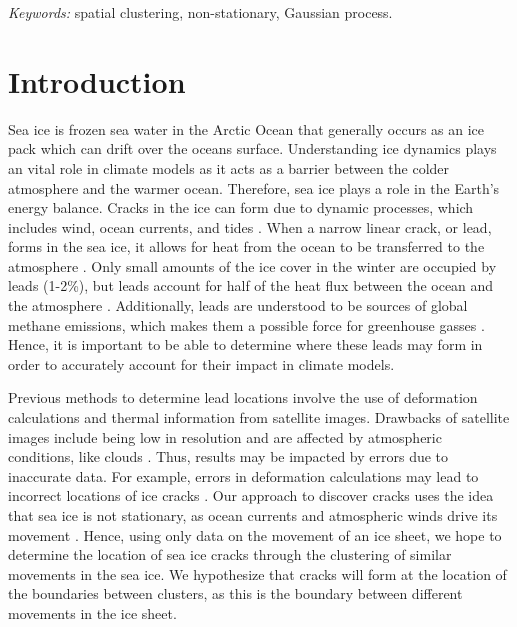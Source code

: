 \documentclass[12pt]{article}
\begin{document}
\noindent%
{\it Keywords:} spatial clustering, non-stationary, Gaussian process.
\vfill

\newpage
{} %

\hypertarget{introduction}{%
\section{Introduction}\label{introduction}}

Sea ice is frozen sea water in the Arctic Ocean that generally occurs as
an ice pack which can drift over the oceans surface. Understanding ice
dynamics plays an vital role in climate models as it acts as a barrier
between the colder atmosphere and the warmer ocean. Therefore, sea ice
plays a role in the Earth's energy balance. Cracks in the ice can form
due to dynamic processes, which includes wind, ocean currents, and tides
\citep{hutter_leads_2019}. When a narrow linear crack, or lead, forms in
the sea ice, it allows for heat from the ocean to be transferred to the
atmosphere \citep{schreyer_elastic_2006}. Only small amounts of the ice
cover in the winter are occupied by leads (1-2\%), but leads account for
half of the heat flux between the ocean and the atmosphere
\citep{badgley_1961}. Additionally, leads are understood to be sources
of global methane emissions, which makes them a possible force for
greenhouse gasses \citep{kort_atmos_2012}. Hence, it is important to be
able to determine where these leads may form in order to accurately
account for their impact in climate models.

Previous methods to determine lead locations involve the use of
deformation calculations and thermal information from satellite images.
Drawbacks of satellite images include being low in resolution and are
affected by atmospheric conditions, like clouds
\citep{key_detectability_1993}. Thus, results may be impacted by errors
due to inaccurate data. For example, errors in deformation calculations
may lead to incorrect locations of ice cracks
\citep{bouillon_producing_2015}. Our approach to discover cracks uses
the idea that sea ice is not stationary, as ocean currents and
atmospheric winds drive its movement \citep{peterson_evaluating_2011}.
Hence, using only data on the movement of an ice sheet, we hope to
determine the location of sea ice cracks through the clustering of
similar movements in the sea ice. We hypothesize that cracks will form
at the location of the boundaries between clusters, as this is the
boundary between different movements in the ice sheet.
\end{document}
